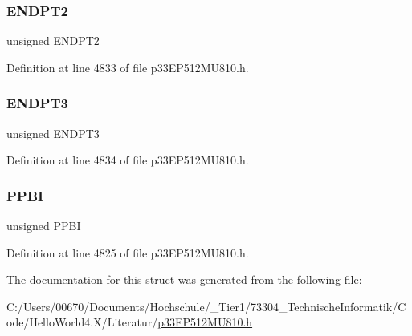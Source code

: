 \subsubsection{\texorpdfstring{E\+N\+D\+P\+T2}{ENDPT2}}
{\footnotesize\ttfamily unsigned E\+N\+D\+P\+T2}



Definition at line 4833 of file p33\+E\+P512\+M\+U810.\+h.

\mbox{\label{structtag_u1_s_t_a_t_b_i_t_s_abae74c9c182706488bdd4a874c489aa7}} 
\subsubsection{\texorpdfstring{E\+N\+D\+P\+T3}{ENDPT3}}
{\footnotesize\ttfamily unsigned E\+N\+D\+P\+T3}



Definition at line 4834 of file p33\+E\+P512\+M\+U810.\+h.

\mbox{\label{structtag_u1_s_t_a_t_b_i_t_s_a3a32c5a0c64fb0ccf11eba639ed65501}} 
\subsubsection{\texorpdfstring{P\+P\+BI}{PPBI}}
{\footnotesize\ttfamily unsigned P\+P\+BI}



Definition at line 4825 of file p33\+E\+P512\+M\+U810.\+h.



The documentation for this struct was generated from the following file\+:\begin{DoxyCompactItemize}
\item 
C\+:/\+Users/00670/\+Documents/\+Hochschule/\+\_\+\+Tier1/73304\+\_\+\+Technische\+Informatik/\+Code/\+Hello\+World4.\+X/\+Literatur/\hyperlink{p33_e_p512_m_u810_8h}{p33\+E\+P512\+M\+U810.\+h}\end{DoxyCompactItemize}

